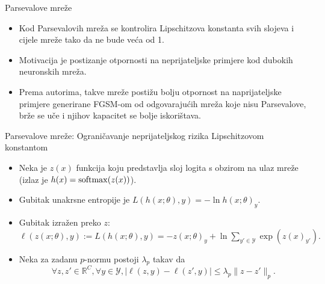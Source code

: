 \documentclass{beamer}
\begin{document}
\begin{frame}{Parsevalove mreže}
\begin{itemize}
	\item Kod Parsevalovih mreža se kontrolira Lipschitzova konstanta svih slojeva i cijele mreže tako da ne bude veća od 1.
	\item Motivacija je postizanje otpornosti na neprijateljske primjere kod dubokih neuronskih mreža.
	\item Prema autorima, takve mreže postižu bolju otpornost na naprijateljske primjere generirane FGSM-om od odgovarajućih mreža koje nisu Parsevalove, brže se uče i njihov kapacitet se bolje iskorištava.
\end{itemize}
\end{frame}

\begin{frame}{Parsevalove mreže: Ograničavanje neprijateljskog rizika Lipschitzovom konstantom}
\begin{itemize}
	\item Neka je $z(x)$ funkcija koju predstavlja sloj logita s obzirom na ulaz mreže (izlaz je $h(x)=\operatorname{softmax}(z(x))$).
	\item Gubitak unakrsne entropije je $L(h(x;\theta), y) = -\ln h(x;\theta)_y$.
	\item Gubitak izražen preko $z$: $\ell(z(x;\theta),y) := L(h(x;\theta), y) = -z(x;\theta)_y + \ln \sum_{y'\in\mathcal{Y}}\exp(z(x)_{y'}).$
	\item Neka za zadanu $p$-normu postoji $\lambda_p$ takav da
	\begin{equation}\label{eq:loss-lipschitz}
	\forall z,z'\in \mathbb{R}^C, \forall y\in\mathcal{Y},
	\lvert \ell(z,y)-\ell(z',y)\rvert 
	\leq \lambda_p\lVert z-z'\rVert_p.
	\end{equation}
\end{itemize}
\end{frame}
\end{document}
